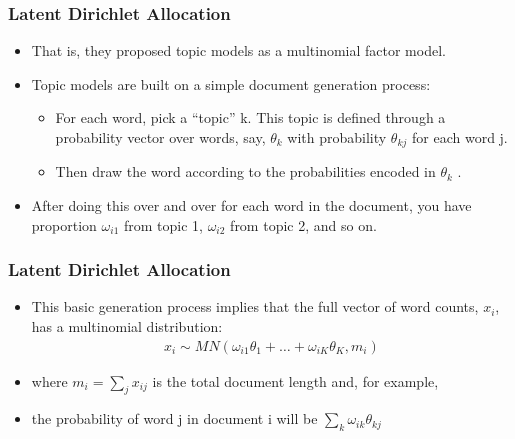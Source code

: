 \documentclass[
  shownotes,
  xcolor={svgnames},
  hyperref={colorlinks,citecolor=DarkBlue,linkcolor=DarkRed,urlcolor=DarkBlue}
  , aspectratio=169]{beamer}
\begin{document}
\begin{frame}
\frametitle{Latent Dirichlet Allocation}

\begin{itemize}

\item That is, they proposed topic models as a multinomial factor model. 
\medskip
\item Topic models are built on a simple document generation process: 
\medskip
\begin{itemize}

\item  For each word, pick a “topic” k. This topic is defined through a probability vector over words, say, $\theta_k$ with probability $\theta_{kj}$ for each word j. 
\medskip
\item Then draw the word according to the probabilities encoded in $\theta_k$ . 
\medskip
\end{itemize}
\item After doing this over and over for each word in the document, you have proportion $\omega_{i1}$ from topic 1, $\omega_{i2}$ from topic 2, and so on. 

\end{itemize}
\end{frame}
\begin{frame}
\frametitle{Latent Dirichlet Allocation}

\begin{itemize}


\item This basic generation process implies that the full vector of word counts, $x_i$, has a multinomial  distribution: 
\begin{align}
x_i \sim MN(\omega_{i1}\theta_1+\dots+\omega_{iK}\theta_K,m_i)
\end{align}
\item where $m_i=\sum_j x_{ij}$ is the total document length and, for example, 
\item the probability of word j in document i will be $\sum_k \omega_{ik}\theta_{kj}$

\end{itemize}


\end{frame}
\end{document}
